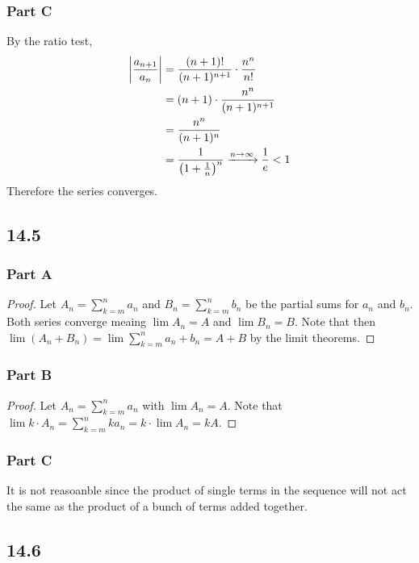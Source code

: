 \documentclass[12pt,titlepage]{extarticle}
\begin{document}
\subsubsection*{Part C}
By the ratio test,
\begin{align*}
    \qty|\frac{a_{n+1}}{a_n}| &= \frac{(n+1)!}{(n+1)^{n+1}} \cdot \frac{n^n}{n!} \\
                              &= (n+1) \cdot \frac{n^n}{(n+1)^{n+1}} \\
                              &= \frac{n^n}{(n+1)^n} \\
                              &= \frac{1}{\qty(1 + \frac{1}{n})^n} \xrightarrow{n \to \infty} \frac{1}{e} < 1
\end{align*}
Therefore the series converges.

\subsection*{14.5}
\subsubsection*{Part A}
\begin{proof}
    Let $A_n = \sum_{k = m}^n a_n$ and $B_n = \sum_{k = m}^n b_n$ be the partial sums for $a_{n}$ and $b_{n}$. Both series converge meaing $\lim A_n = A$ and $\lim B_n = B$. Note that then $\lim(A_n + B_n) = \lim \sum_{k = m}^n a_n + b_n = A + B$ by the limit theorems.
\end{proof}

\subsubsection*{Part B}
\begin{proof}
    Let $A_n = \sum_{k = m}^n a_n$ with $\lim A_n = A$. Note that $\lim k \cdot A_n = \sum_{k = m}^n k a_n = k \cdot \lim A_n = kA$.
\end{proof}

\subsubsection*{Part C}
It is not reasoanble since the product of single terms in the sequence will not act the same as the product of a bunch of terms added together.

\subsection*{14.6}
\end{document}
